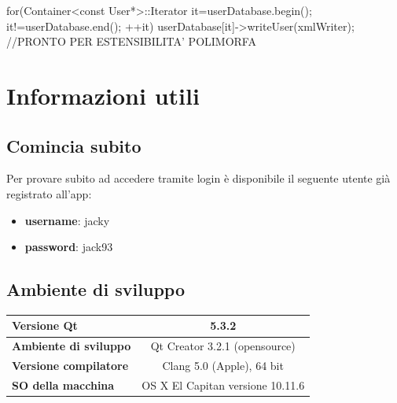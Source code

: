 \documentclass[10pt,a4paper,openany]{article}
\begin{document}
\begin{CPP}
for(Container<const User*>::Iterator it=userDatabase.begin(); it!=userDatabase.end(); ++it)
	userDatabase[it]->writeUser(xmlWriter);	//PRONTO PER ESTENSIBILITA' POLIMORFA
\end{CPP}


\newpage

\section{Informazioni utili}\vspace{10pt}


	\subsection{Comincia subito}
	Per provare subito ad accedere tramite login è disponibile il seguente utente già registrato all'app:

	\begin{itemize}
	\item \textbf{username}: jacky
	\item \textbf{password}: jack93
	\end{itemize}\vspace{20pt}
	
	
	\subsection{Ambiente di sviluppo}

	\def\arraystretch{1.7}%
	\begin{tabular}{|l|c|}
	\hline
	\textbf{Versione Qt} & {5.3.2}  \\
	\hline
	\textbf{Ambiente di sviluppo} & Qt Creator 3.2.1 (opensource) \\
	\hline
	\textbf{Versione compilatore} & Clang 5.0 (Apple), 64 bit \\
	\hline
	\textbf{SO della macchina} & OS X El Capitan versione 10.11.6 \\
	\hline
	\end{tabular}
	





	

\end{document}
